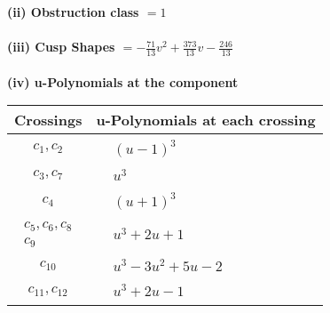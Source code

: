 \documentclass[1p]{elsarticle_modified}
\theoremstyle{definition}
\begin{document}
\flushleft \textbf{(ii) Obstruction class $= 1$}\\~\\
\flushleft \textbf{(iii) Cusp Shapes $= -\frac{71}{13} v^2+\frac{373}{13} v-\frac{246}{13}$}\\~\\
\newpage\renewcommand{\arraystretch}{1}
\flushleft \textbf{(iv) u-Polynomials at the component}\newline \\
\begin{tabular}{m{50pt}|m{274pt}}
Crossings & \hspace{64pt}u-Polynomials at each crossing \\
\hline $$\begin{aligned}c_{1},c_{2}\end{aligned}$$&$\begin{aligned}
&(u-1)^3
\end{aligned}$\\
\hline $$\begin{aligned}c_{3},c_{7}\end{aligned}$$&$\begin{aligned}
&u^3
\end{aligned}$\\
\hline $$\begin{aligned}c_{4}\end{aligned}$$&$\begin{aligned}
&(u+1)^3
\end{aligned}$\\
\hline $$\begin{aligned}c_{5},c_{6},c_{8}\\c_{9}\end{aligned}$$&$\begin{aligned}
&u^3+2 u+1
\end{aligned}$\\
\hline $$\begin{aligned}c_{10}\end{aligned}$$&$\begin{aligned}
&u^3-3 u^2+5 u-2
\end{aligned}$\\
\hline $$\begin{aligned}c_{11},c_{12}\end{aligned}$$&$\begin{aligned}
&u^3+2 u-1
\end{aligned}$\\
\hline
\end{tabular}\\~\\
\end{document}
